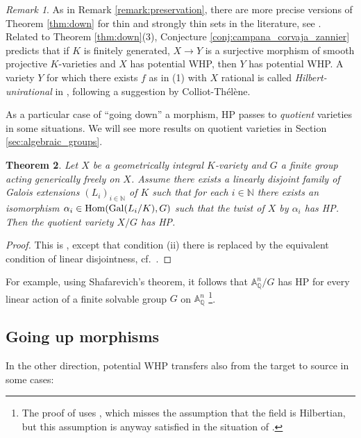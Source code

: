 \documentclass[10pt,a4paper]{amsart}
\theoremstyle{plain}
\newtheorem{theorem}{Theorem}
\theoremstyle{remark}
\newtheorem{remark}[theorem]{Remark}
\numberwithin{theorem}{section}
\begin{document}
\begin{remark}
As in Remark \ref{remark:preservation}, there are more precise versions of Theorem \ref{thm:down} for thin and strongly thin sets in the literature,
see \cite[Remark 5.4]{BFP24}.
Related to Theorem \ref{thm:down}(3), Conjecture \ref{conj:campana_corvaja_zannier}
predicts that if
$K$ is finitely generated,
$X\to Y$ is a surjective morphism of smooth projective $K$-varieties 
and $X$ has potential WHP, then $Y$ has potential WHP.
A variety $Y$ for which there exists $f$ as in (1) with $X$ rational is called
{\em Hilbert-unirational} in \cite{DemeioStreeterWinter}, following a suggestion by Colliot-Th\'el\`ene.
\end{remark}
 
As a particular case of ``going down'' a morphism,
HP passes to {\em quotient} varieties in some situations.
We will see more results on quotient varieties in Section \ref{sec:algebraic_groups}.

\begin{theorem}  
Let $X$ be a geometrically integral $K$-variety
and $G$ a finite group acting generically freely on $X$.
Assume there exists a linearly disjoint family of Galois extensions $(L_i)_{i\in\mathbb{N}}$ of $K$
such that for each $i\in \mathbb{N}$ there exists
an isomorphism $\alpha_i\in{\rm Hom}({\rm Gal}(L_i/K),G)$
such that the twist of $X$ by $\alpha_i$ has HP.
Then the quotient variety $X/G$ has HP.
\end{theorem}

\begin{proof}  
This is \cite[Theorem 3.1]{Demeio}, except that condition (ii) there is replaced 
by the equivalent condition of linear disjointness, cf.~\cite[Remark 3.4]{Demeio}.
\end{proof}

For example, using Shafarevich's theorem,
it follows that $\mathbb{A}^n_\mathbb{Q}/G$ has HP for every 
linear action of a finite solvable group $G$ on $\mathbb{A}^n_\mathbb{Q}$ \cite[Corollary 3.5]{Demeio}\footnote{The proof of \cite[Corollary 3.5]{Demeio} uses \cite[Proposition 1.2]{Demeio}, which misses the assumption that the field is Hilbertian, but this assumption is anyway satisfied in the situation of \cite[Corollary 3.5]{Demeio}.}.


\subsection{Going up morphisms}
In the other direction, potential WHP transfers also from the target to source in some cases:
\end{document}

